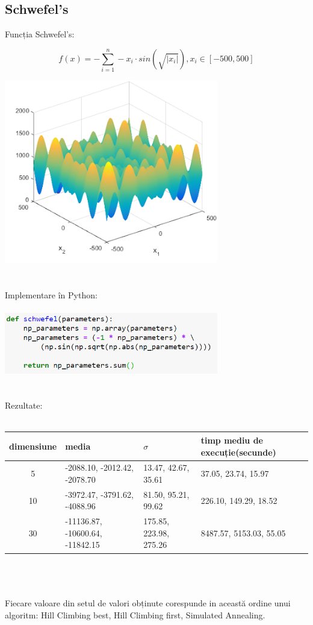 \documentclass{article}
\begin{document}
\subsection*{Schwefel's}
Funcția Schwefel's:

$$  f(x) = - \sum_{i=1}^n - x_i \cdot sin(\sqrt{\left | x_i \right |}), x_i \in \left[ -500, 500 \right]  $$

\includegraphics[width=0.7\textwidth]{schwefel}\\\\\\
Implementare în Python:\\\\
\includegraphics[width=0.7\textwidth]{4b}\\\\\\
Rezultate:\\\\
\begin{tabular}{||c|||l|l|l||}
  \hline
  dimensiune & media & $\sigma$ & timp mediu de execuție(secunde)\\ \hline \hline
  5	  & -2088.10, -2012.42, -2078.70 & 13.47, 42.67, 35.61 & 37.05, 23.74, 15.97 \\ \hline
  10  & -3972.47, -3791.62, -4088.96 & 81.50, 95.21, 99.62 & 226.10, 149.29, 18.52 \\ \hline
  30  & -11136.87, -10600.64, -11842.15 & 175.85, 223.98, 275.26 & 8487.57, 5153.03, 55.05 \\ \hline
\end{tabular}\\\\\\
Fiecare valoare din setul de valori obținute corespunde in această ordine unui algoritm: Hill Climbing best, Hill Climbing first, Simulated Annealing.
\end{document}
